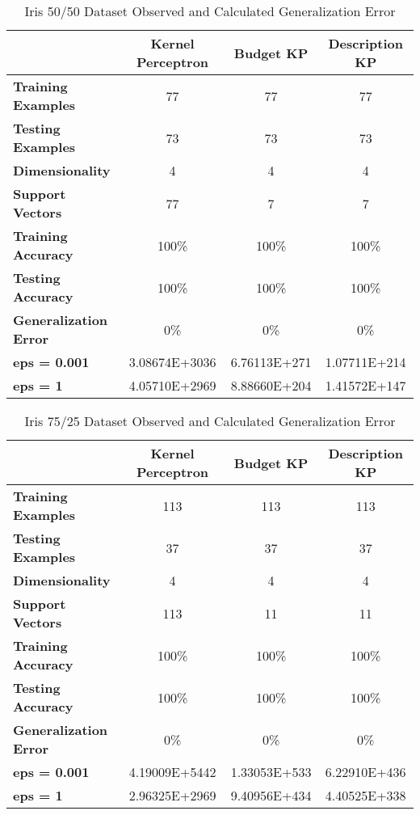 \begin{table}[p]
 \begin{center}
  \caption{Iris 50/50 Dataset Observed and Calculated Generalization Error}
  \label{tab:iris50gencalc}
  \begin{tabular}{l|c|c|c}
  \textbf{ } & \textbf{Kernel Perceptron} & \textbf{Budget KP} & \textbf{Description KP}\\
  \hline
  \textbf{Training Examples} & 77 & 77 & 77\\
  \textbf{Testing Examples} & 73 & 73 & 73\\
  \textbf{Dimensionality} & 4 & 4 & 4\\
  \textbf{Support Vectors} & 77 & 7 & 7\\
  \hline
  \textbf{Training Accuracy} & 100\% & 100\% & 100\%\\
  \textbf{Testing Accuracy} & 100\% & 100\% & 100\%\\
  \textbf{Generalization Error} & 0\% & 0\% & 0\%\\
  \hline
  \textbf{eps = 0.001} & 3.08674E+3036 & 6.76113E+271 & 1.07711E+214\\
  \textbf{eps = 1} & 4.05710E+2969 & 8.88660E+204 & 1.41572E+147\\
  \end{tabular}
 \end{center}
\end{table}

\begin{table}[p]
 \begin{center}
  \caption{Iris 75/25 Dataset Observed and Calculated Generalization Error}
  \label{tab:iris75gencalc}
  \begin{tabular}{l|c|c|c}
  \textbf{ } & \textbf{Kernel Perceptron} & \textbf{Budget KP} & \textbf{Description KP}\\
  \hline
  \textbf{Training Examples} & 113 & 113 & 113\\
  \textbf{Testing Examples} & 37 & 37 & 37\\
  \textbf{Dimensionality} & 4 & 4 & 4\\
  \textbf{Support Vectors} & 113 & 11 & 11\\
  \hline
  \textbf{Training Accuracy} & 100\% & 100\% & 100\%\\
  \textbf{Testing Accuracy} & 100\% & 100\% & 100\%\\
  \textbf{Generalization Error} & 0\% & 0\% & 0\%\\
  \hline
  \textbf{eps = 0.001} & 4.19009E+5442 & 1.33053E+533 & 6.22910E+436\\
  \textbf{eps = 1} & 2.96325E+2969 & 9.40956E+434 & 4.40525E+338\\
  \end{tabular}
 \end{center}
\end{table}

